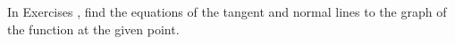{\noindent In Exercises}
{, find the equations of the tangent and normal lines to  the graph of the function at the given point.
}
